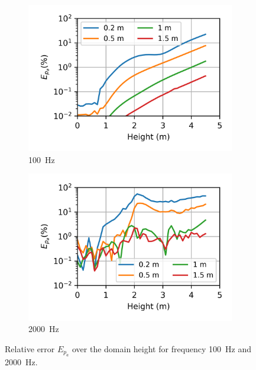 {\begin{figure}
	\centering
	\begin{subfigure}[b]{0.48\textwidth}
		\centering
		\includegraphics{fig/chap4/simulation_domain/error_100_Hz.png}
		\caption{\SI{100}{\hertz}}
		\label{fig:relative_error_over_height_100Hz}
	\end{subfigure}
	\hfill
	\begin{subfigure}[b]{0.48\textwidth}
		\centering
		\includegraphics{fig/chap4/simulation_domain/error_2000_Hz.png}
		\caption{\SI{2000}{\hertz}}
		\label{fig:relative_error_over_height_2000Hz}
	\end{subfigure}
	\caption{Relative error $E_{p_a}$ over the domain height for frequency \SI{100}{\hertz} and \SI{2000}{\hertz}.}
	\label{fig:relative_error_over_height}
\end{figure}

}
